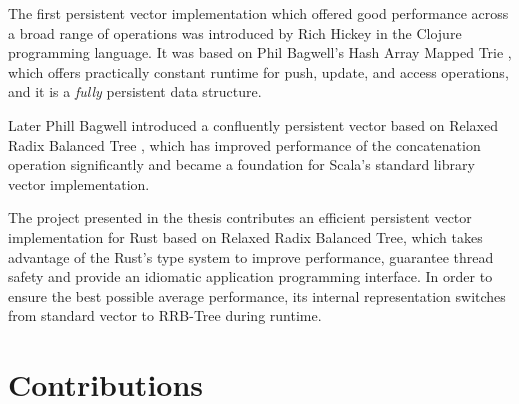 The first persistent vector implementation which offered good performance across a broad range of operations was introduced by Rich Hickey in the Clojure programming language. It was based on Phil Bagwell's Hash Array Mapped Trie \cite{ideal-hash-trees}, which offers practically constant runtime for push, update, and access operations, and it is a \emph{fully} persistent data structure.

Later Phill Bagwell introduced a confluently persistent vector based on Relaxed Radix Balanced Tree \cite{efficient-immutable-vectors}, which has improved performance of the concatenation operation significantly and became a foundation for Scala's standard library vector implementation.

The project presented in the thesis contributes an efficient persistent vector implementation for Rust based on Relaxed Radix Balanced Tree, which takes advantage of the Rust's type system to improve performance, guarantee thread safety and provide an idiomatic application programming interface. In order to ensure the best possible average performance, its internal representation switches from standard vector to RRB-Tree during runtime.

\section{Contributions}
\label{sec:contributions}
